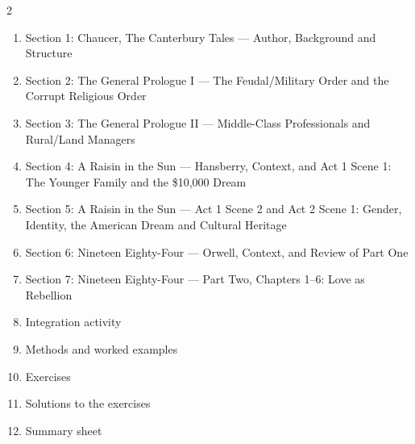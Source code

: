 \documentclass[11pt]{article}
\begin{document}
\begin{sommaire}
\begin{multicols}{2}
\begin{enumerate}
\item Section 1: Chaucer, The Canterbury Tales — Author, Background and Structure
\item Section 2: The General Prologue I — The Feudal/Military Order and the Corrupt Religious Order
\item Section 3: The General Prologue II — Middle-Class Professionals and Rural/Land Managers
\item Section 4: A Raisin in the Sun — Hansberry, Context, and Act 1 Scene 1: The Younger Family and the \$10,000 Dream
\item Section 5: A Raisin in the Sun — Act 1 Scene 2 and Act 2 Scene 1: Gender, Identity, the American Dream and Cultural Heritage
\item Section 6: Nineteen Eighty-Four — Orwell, Context, and Review of Part One
\item Section 7: Nineteen Eighty-Four — Part Two, Chapters 1–6: Love as Rebellion
\item Integration activity
\item Methods and worked examples
\item Exercises
\item Solutions to the exercises
\item Summary sheet
\end{enumerate}
\end{multicols}
\end{sommaire}
\end{document}
